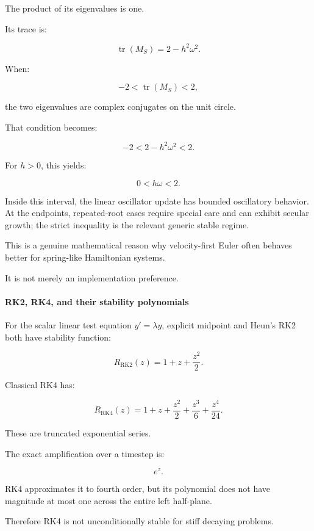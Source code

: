 The product of its eigenvalues is one.

Its trace is:

\[
\operatorname{tr}(M_S)=2-h^2\omega^2.
\]

When:

\[
-2<\operatorname{tr}(M_S)<2,
\]

the two eigenvalues are complex conjugates on the unit circle.

That condition becomes:

\[
-2<2-h^2\omega^2<2.
\]

For \(h>0\), this yields:

\[
\boxed{0<h\omega<2}.
\]

Inside this interval, the linear oscillator update has bounded oscillatory behavior. At the endpoints, repeated-root cases require special care and can exhibit secular growth; the strict inequality is the relevant generic stable regime.

This is a genuine mathematical reason why velocity-first Euler often behaves better for spring-like Hamiltonian systems.

It is not merely an implementation preference.

\paragraph{RK2, RK4, and their stability polynomials}\label{02-foundations-ii-ch025-rk2-rk4-and-their-stability-polynomials}

\hypertarget{02-foundations-ii-ch025-rk2-rk4-and-their-stability-polynomials}{}

For the scalar linear test equation \(y'=\lambda y\), explicit midpoint and Heun's RK2 both have stability function:

\[
\boxed{ R_{\mathrm{RK2}}(z)=1+z+\frac{z^2}{2} }.
\]

Classical RK4 has:

\[
\boxed{ R_{\mathrm{RK4}}(z)= 1+z+\frac{z^2}{2} +\frac{z^3}{6} +\frac{z^4}{24} }.
\]

These are truncated exponential series.

The exact amplification over a timestep is:

\[
e^z.
\]

RK4 approximates it to fourth order, but its polynomial does not have magnitude at most one across the entire left half-plane.

Therefore RK4 is not unconditionally stable for stiff decaying problems.

